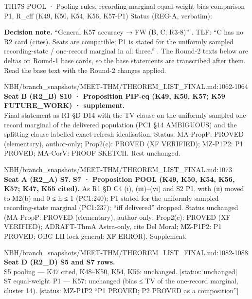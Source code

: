 \begin{card}{TH17}{S-POOL · Pooling rules, recording-marginal equal-weight bias comparison P1, R\_eff (K49, K50, K54, K56, K57-P1)}
\approvedFB\quad Status (REG-A, verbatim):  

\textbf{Decision note.} ``General K57 accuracy → FW (B, C; R3-8)'' . TLF: ``C has no R2 card (cites). Seats are compatible; P1 is stated for the uniformly sampled recording-state / one-record marginal in all three.'' . The Round-2 texts below are deltas on Round-1 base cards, so the base statements are transcribed after them. Read the base text with the Round-2 changes applied.

\begin{stmt}{NBH/branch_snapshots/MEET-THM/THEOREM_LIST_FINAL.md:1062-1064}
\textbf{Seat B (R2\_B) S10 · Proposition PIP-eq (K49, K50, K57; K59 FUTURE\_WORK) · supplement.}\\
Final statement as R1 §D D14 with the TV clause on the uniformly sampled one-record marginal of the delivered population (PC1 §14 AMBIGUOUS) and the splitting clause labelled exact-refresh idealisation. Status: MA-PropP: PROVED (elementary), author-only; Prop2(c): PROVED (XF VERIFIED); MZ-P1P2: P1 PROVED; MA-CorV: PROOF SKETCH. Rest unchanged.
\end{stmt}

\begin{stmt}{NBH/branch_snapshots/MEET-THM/THEOREM_LIST_FINAL.md:1073}
\textbf{Seat A (R2\_A) S7.} \textbf{S7 · Proposition POOL (K49, K50, K54, K56, K57; K47, K55 cited).} As R1 §D C4 (i), (iii)–(vi) and S2 P1, with (ii) moved to M2(b) and 0 ≤ h ≤ 1 (PC1:240); P1 stated for the uniformly sampled recording-state marginal (PC1:237); ``iff delivered'' dropped. Status unchanged (MA-PropP: PROVED (elementary), author-only; Prop2(c): PROVED (XF VERIFIED); ADRAFT-ThmA Astra-only, cite Del Moral; MZ-P1P2: P1 PROVED; OBG-LH-lock-general: XF ERROR). Supplement.
\end{stmt}

\begin{stmt}{NBH/branch_snapshots/MEET-THM/THEOREM_LIST_FINAL.md:1082-1088}
\textbf{Seat D (R2\_D) S5 and S7 rows.}\\
S5 pooling — K47 cited, K48–K50, K54, K56: unchanged. [status: unchanged]\\
S7 equal-weight P1 — K57: unchanged (bias ≤ TV of the one-record marginal, cluster 14). [status: MZ-P1P2 ``P1 PROVED; P2 PROVED as a composition'']
\end{stmt}


\end{card}
